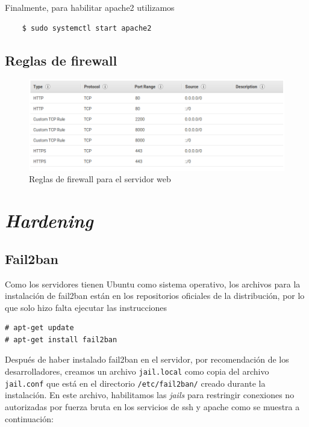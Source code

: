 \documentclass[12pt]{article}
\begin{document}
Finalmente, para habilitar \textsf{apache2} utilizamos
\begin{verbatim}
    $ sudo systemctl start apache2
\end{verbatim}

\subsection{Reglas de firewall}
\begin{figure}[H]
  \centering
  \includegraphics[width=\textwidth]{lamesec}
  \caption{Reglas de \textsf{firewall} para el servidor web}
\end{figure}


\section{\textit{Hardening}}
\subsection{Fail2ban}
Como los servidores tienen \textsf{Ubuntu} como sistema operativo, los archivos para la instalación de \textsf{fail2ban} están en los repositorios oficiales de la distribución, por lo que solo hizo falta ejecutar las instrucciones
\begin{verbatim}
# apt-get update
# apt-get install fail2ban
\end{verbatim}
Después de haber instalado \textsf{fail2ban} en el servidor, por recomendación de los desarrolladores, creamos un archivo \texttt{jail.local} como copia del archivo \texttt{jail.conf} que está en el directorio \texttt{/etc/fail2ban/} creado durante la instalación. En este archivo, habilitamos las \textit{jails} para restringir conexiones no autorizadas por fuerza bruta en los servicios de \textsf{ssh} y \textsf{apache} como se muestra a continuación:
\end{document}
